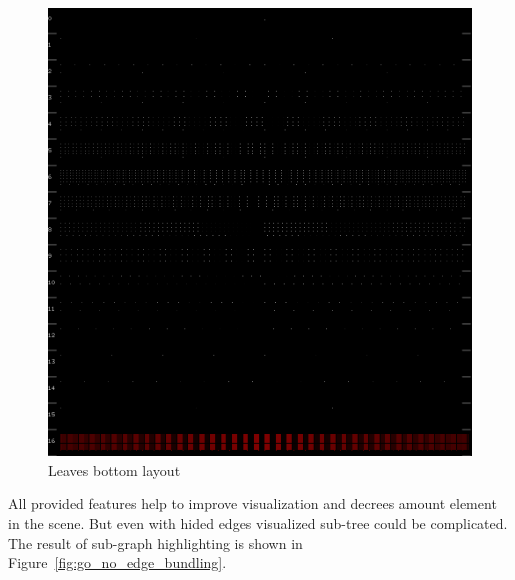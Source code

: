 \begin{figure}[h!]
\centering
\includegraphics[scale=0.3]{pictures/go_leaves_bottom_layout.png}
\caption{Leaves bottom layout}
\label{fig:go_leaves_bottom_layout}
\end{figure}

All provided features help to improve visualization and decrees amount element in the scene. But even with hided edges visualized sub-tree could be complicated. The result of sub-graph highlighting is shown in Figure~\ref{fig:go_no_edge_bundling}.

